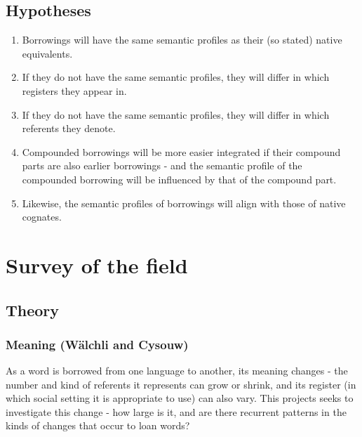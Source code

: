\documentclass[a4paper]{article}
\begin{document}
\subsection{Hypotheses}
\begin{enumerate}
	\item Borrowings will have the same semantic profiles as their (so stated) native equivalents.
	\item If they do not have the same semantic profiles, they will differ in which registers they appear in.
	\item If they do not have the same semantic profiles, they will differ in which referents they denote.
	\item Compounded borrowings will be more easier integrated if their compound parts are also earlier borrowings - and the semantic profile of the compounded borrowing will be influenced by that of the compound part.
	\item Likewise, the semantic profiles of borrowings will align with those of native cognates.
	
\end{enumerate}



\section{Survey of the field}


\subsection{Theory}


\subsubsection{Meaning (W\"alchli and Cysouw)}
\label{sect_meaning}

As a word is borrowed from one language to another, its meaning changes - the number and kind of referents it represents can grow or shrink, and its register (in which social setting it is appropriate to use) can also vary. This projects seeks to investigate this change - how large is it, and are there recurrent patterns in the kinds of changes that occur to loan words?
\end{document}
